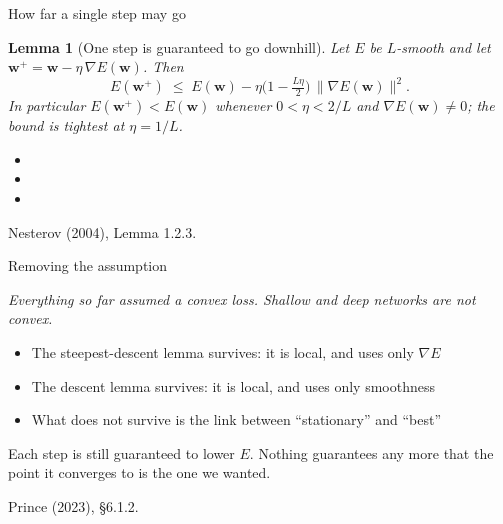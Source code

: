 \documentclass[aspectratio=169, 11pt]{beamer}
\newtheorem{lemmax}[theorem]{Lemma}
\newcommand{\bridge}[1]{%
  {\scriptsize\itshape\color{mcMuted} #1\par}\vspace{0.35em}}
\newcommand{\srcline}[1]{%
  \par\vspace{0.25em}%
  {\scriptsize\color{mcMuted}\hfill #1\par}}
\newcommand{\src}[3]{}      %
\begin{document}
\begin{frame}{How far a single step may go}
  \src{nesterov2004}{section}{1.2.2}
  \vspace{-0.25em}
  \begin{lemmax}[One step is guaranteed to go downhill]\label{th:desc}
    \small
    Let $E$ be $L$-smooth and let $\mathbf{w}^+ = \mathbf{w} - \eta\,\nabla E(\mathbf{w})$. Then
    \[
      E(\mathbf{w}^+) \;\leq\; E(\mathbf{w})
        - \eta\Big(1 - \tfrac{L\eta}{2}\Big)\,\|\nabla E(\mathbf{w})\|^2 .
    \]
    In particular $E(\mathbf{w}^+) < E(\mathbf{w})$ whenever $0 < \eta < 2/L$ and
    $\nabla E(\mathbf{w}) \neq 0$; the bound is tightest at $\eta = 1/L$.
  \end{lemmax}
  {\footnotesize
  \begin{itemize}\itemsep0.26em
    \item {}
    \item {}
    \item {}
  \end{itemize}}
  \vspace{-0.35em}
  \srcline{Nesterov (2004), Lemma 1.2.3.}
\end{frame}

\begin{frame}{Removing the assumption}
  \src{prince2023}{section}{6.1.2}
  \bridge{Everything so far assumed a convex loss. Shallow and deep
  networks are not convex.}
  \vspace{0.5em}
  \begin{itemize}\itemsep0.45em
    \item The steepest-descent lemma survives: it is local, and uses only
          $\nabla E$
    \item The descent lemma survives: it is local, and uses only
          smoothness
    \item What does \alert{not} survive is the link between
          ``stationary'' and ``best''
  \end{itemize}
  \vspace{0.7em}
  \begin{redhighlight}
    Each step is still guaranteed to lower $E$. Nothing guarantees any
    more that the point it converges to is the one we wanted.
  \end{redhighlight}
  \srcline{Prince (2023), \S6.1.2.}
\end{frame}
\end{document}
